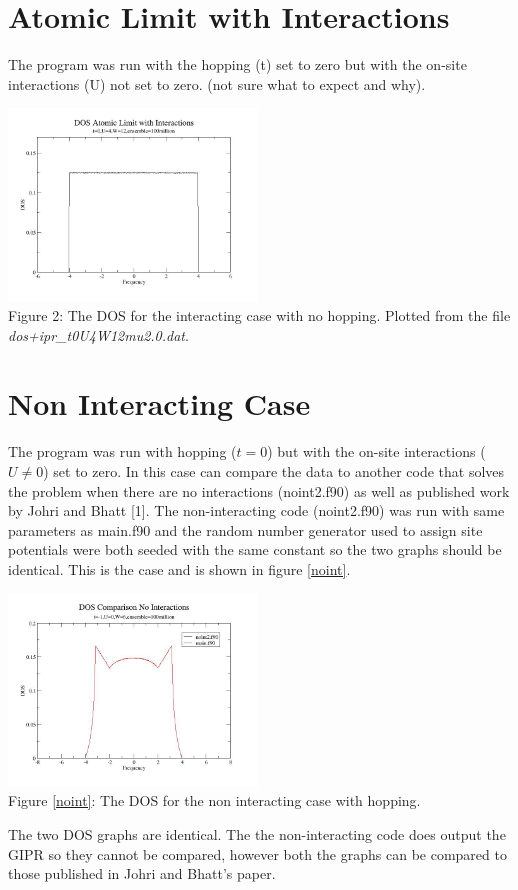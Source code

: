 \documentclass{article}
\begin{document}
\section{Atomic Limit with Interactions}
The program was run with the hopping (t) set to zero but with the on-site interactions (U) not set to zero. (not sure what to expect and why).

\begin{center}
	\includegraphics[width=250px]{dos2_t0u4w12.jpg} \\
	Figure 2: The DOS for the interacting case with no hopping. Plotted from the file \textit{dos+ipr\_t0U4W12mu2.0.dat}.
\end{center}

\section{Non Interacting Case}
The program was run with hopping ($t=0$) but with the on-site interactions ($U\ne0$) set to zero. In this case can compare the data to another code that solves the problem when there are no interactions (noint2.f90) as well as published work by Johri and Bhatt [1]. The non-interacting code (noint2.f90) was run with same parameters as main.f90 and the random number generator used to assign site potentials were both seeded with the same constant so the two graphs should be identical. This is the case and is shown in figure \ref{noint}.
\begin{center} 
	\includegraphics[width=250px]{dos_compareu0.jpg} \\ \label{noint}
	Figure \ref{noint}: The DOS for the non interacting case with hopping.
\end{center}
The two DOS graphs are identical. The the non-interacting code does output the GIPR so they cannot be compared, however both the graphs can be compared to those published in Johri and Bhatt's paper. 
\end{document}
